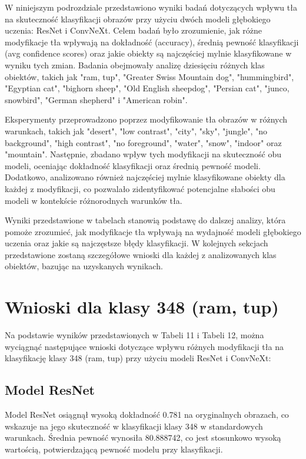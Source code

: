 W niniejszym podrozdziale przedstawiono wyniki badań dotyczących wpływu tła na skuteczność klasyfikacji obrazów przy użyciu 
dwóch modeli głębokiego uczenia: ResNet i ConvNeXt. Celem badań było zrozumienie, jak różne modyfikacje tła wpływają na 
dokładność (accuracy), średnią pewność klasyfikacji (avg confidence scores) oraz jakie obiekty są najczęściej mylnie 
klasyfikowane w wyniku tych zmian. Badania obejmowały analizę dziesięciu różnych klas obiektów, takich jak "ram, tup", 
"Greater Swiss Mountain dog", "hummingbird", "Egyptian cat", "bighorn sheep", "Old English sheepdog", "Persian cat", "junco, 
snowbird", "German shepherd" i "American robin".

Eksperymenty przeprowadzono poprzez modyfikowanie tła obrazów w różnych warunkach, takich jak "desert", "low contrast", 
"city", "sky", "jungle", "no background", "high contrast", "no foreground", "water", "snow", "indoor" oraz "mountain". 
Następnie, zbadano wpływ tych modyfikacji na skuteczność obu modeli, oceniając dokładność klasyfikacji oraz średnią pewność 
modeli. Dodatkowo, analizowano również najczęściej mylnie klasyfikowane obiekty dla każdej z modyfikacji, co pozwalało 
zidentyfikować potencjalne słabości obu modeli w kontekście różnorodnych warunków tła.

Wyniki przedstawione w tabelach stanowią podstawę do dalszej analizy, która pomoże zrozumieć, jak modyfikacje tła wpływają na 
wydajność modeli głębokiego uczenia oraz jakie są najczęstsze błędy klasyfikacji. W kolejnych sekcjach przedstawione zostaną 
szczegółowe wnioski dla każdej z analizowanych klas obiektów, bazując na uzyskanych wynikach.

\section*{Wnioski dla klasy 348 (ram, tup)}

Na podstawie wyników przedstawionych w Tabeli 11 i Tabeli 12, można wyciągnąć następujące wnioski dotyczące wpływu różnych 
modyfikacji tła na klasyfikację klasy 348 (ram, tup) przy użyciu modeli ResNet i ConvNeXt:

\subsection*{Model ResNet}

Model ResNet osiągnął wysoką dokładność 0.781 na oryginalnych obrazach, co wskazuje na jego skuteczność w klasyfikacji klasy 
348 w standardowych warunkach. Średnia pewność wynosiła 80.888742, co jest stosunkowo wysoką wartością, potwierdzającą pewność 
modelu przy klasyfikacji.

